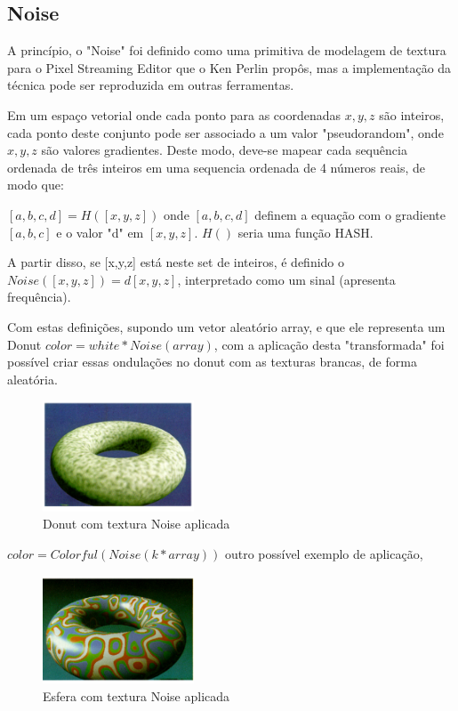 \subsection{Noise}

A princípio, o "Noise" foi definido como uma primitiva de modelagem de textura para o Pixel Streaming Editor que o Ken Perlin \cite{fractalNoise} propôs, mas a implementação da técnica pode ser reproduzida em outras ferramentas. 

Em um espaço vetorial onde cada ponto para as coordenadas $x,y,z$ são inteiros, cada ponto deste conjunto pode ser associado a um valor "pseudorandom", onde $x, y, z$ são valores gradientes.
Deste modo, deve-se mapear cada sequência ordenada de três inteiros em uma sequencia ordenada de 4 números reais, de modo que:

$[a,b,c,d] = H([x,y,z])$ onde $[a,b,c,d]$ definem a equação com o gradiente $[a,b,c]$ e o valor "d" em $[x,y,z]$. $H()$ seria uma função HASH. 

A partir disso, se [x,y,z] está neste set de inteiros, é definido o $Noise([x,y,z]) = d[x,y,z]$, interpretado como um sinal (apresenta frequência). 

Com estas definições, supondo um vetor aleatório array, e que ele representa um Donut $color = white * Noise(array)$, com a aplicação desta "transformada" foi possível criar essas ondulações no donut com as texturas brancas, de forma aleatória.

\begin{figure}[H]
    \centering
    \includegraphics[width=0.4\textwidth]{img/donut.png}
    \caption{Donut com textura Noise aplicada}
    \label{fig:donut_noise}
\end{figure}

$color = Colorful(Noise(k * array))$ outro possível exemplo de aplicação, 

\begin{figure}[H]
    \centering
    \includegraphics[width=0.4\textwidth]{img/donut2.png}
    \caption{Esfera com textura Noise aplicada}
    \label{fig:sphere_noise}
\end{figure}

